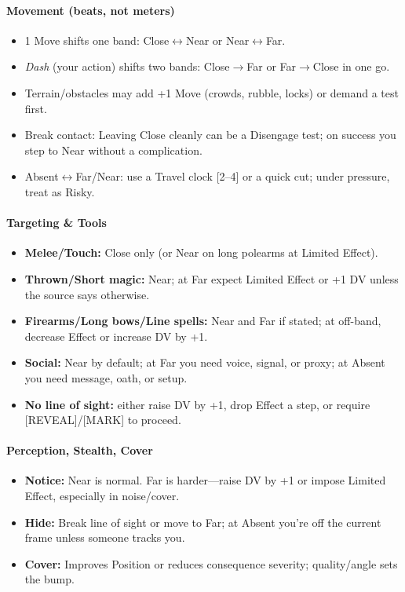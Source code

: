\paragraph{Movement (beats, not meters)}
\begin{itemize}
  \item 1 Move shifts one band: Close$\leftrightarrow$Near or Near$\leftrightarrow$Far.
  \item \emph{Dash} (your action) shifts two bands: Close$\rightarrow$Far or Far$\rightarrow$Close in one go.
  \item Terrain/obstacles may add +1 Move (crowds, rubble, locks) or demand a test first.
  \item Break contact: Leaving Close cleanly can be a Disengage test; on success you step to Near without a complication.
  \item Absent$\leftrightarrow$Far/Near: use a Travel clock [2--4] or a quick cut; under pressure, treat as Risky.
\end{itemize}

\paragraph{Targeting \& Tools}
\begin{itemize}
  \item \textbf{Melee/Touch:} Close only (or Near on long polearms at Limited Effect).
  \item \textbf{Thrown/Short magic:} Near; at Far expect Limited Effect or +1 DV unless the source says otherwise.
  \item \textbf{Firearms/Long bows/Line spells:} Near and Far if stated; at off-band, decrease Effect or increase DV by +1.
  \item \textbf{Social:} Near by default; at Far you need voice, signal, or proxy; at Absent you need message, oath, or setup.
  \item \textbf{No line of sight:} either raise DV by +1, drop Effect a step, or require [REVEAL]/[MARK] to proceed.
\end{itemize}

\paragraph{Perception, Stealth, Cover}
\begin{itemize}
  \item \textbf{Notice:} Near is normal. Far is harder—raise DV by +1 or impose Limited Effect, especially in noise/cover.
  \item \textbf{Hide:} Break line of sight or move to Far; at Absent you’re off the current frame unless someone tracks you.
  \item \textbf{Cover:} Improves Position or reduces consequence severity; quality/angle sets the bump.
\end{itemize}

